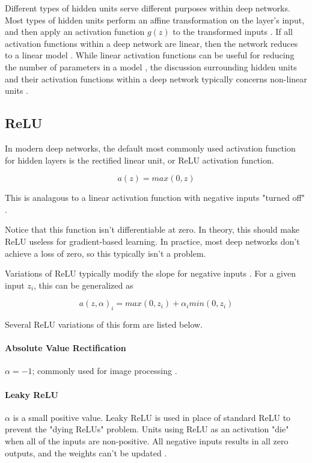 \documentclass{article}
\begin{document}
Different types of hidden units serve different purposes within deep networks. Most types of hidden units perform an affine  transformation on the layer's input, and then apply an activation function \(g(z)\) to the transformed inputs \cite{Goodfellow-et-al-2016}. If all activation functions within a deep network are linear, then the network reduces to a linear model \cite{pml1book}. While linear activation functions can be useful for reducing the number of parameters in a model , the discussion surrounding hidden units and their activation functions within a deep network typically concerns non-linear units \cite{Goodfellow-et-al-2016}. 

\subsection{ReLU}

In modern deep networks, the default most commonly used activation function for hidden layers is the rectified linear unit, or ReLU activation function.

\begin{equation}
    a(z) = max(0, z)
    \label{ReLU-activation}
\end{equation}

This is analagous to a linear activation function with negative inputs "turned off" \cite{pml1book}. 

Notice that this function isn't differentiable at zero. In theory, this should make ReLU useless for gradient-based learning. In practice, most deep networks don't achieve a loss of zero, so this typically isn't a problem.

Variations of ReLU typically modify the slope for negative inputs \cite{Goodfellow-et-al-2016}. For a given input \(z_i\), this can be generalized as

\begin{equation}
    a(z,\alpha)_i = max(0, z_i) + \alpha_i min(0,z_i)
    \label{generalization-ReLU}
\end{equation}

Several ReLU variations of this form are listed below.

\paragraph{Absolute Value Rectification}\(\alpha = -1\); commonly used for image processing \cite{Goodfellow-et-al-2016}.

\paragraph{Leaky ReLU}\(\alpha\) is a small positive value. Leaky ReLU is used in place of standard ReLU to prevent the "dying ReLUs" problem. Units using ReLU as an activation "die" when all of the inputs are non-positive. All negative inputs results in all zero outputs, and the weights can't be updated \cite{hands-on-ml}.
\end{document}

